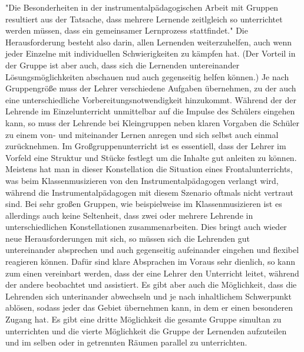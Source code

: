 "Die Besonderheiten in der instrumentalpädagogischen Arbeit mit Gruppen
resultiert aus der Tatsache, dass mehrere Lernende zeitlgleich so unterrichtet
werden müssen, dass ein gemeinsamer Lernprozess stattfindet."
\autocite[221]{busch:grundwissen_instrumentalpaedagogik} Die Herausforderung
besteht also darin, allen Lernenden weiterzuhelfen, auch wenn jeder Einzelne mit
individuellen Schwierigkeiten zu kämpfen hat. (Der Vorteil in der Gruppe ist aber
auch, dass sich die Lernenden untereinander Lösungsmöglichkeiten abschauen nud
auch gegenseitig helfen können.) 
Je nach Gruppengröße muss der Lehrer verschiedene Aufgaben übernehmen,
zu der
auch eine unterschiedliche Vorbereitungsnotwendigkeit hinzukommt. Während der
der Lehrende im Einzelunterricht unmittelbar auf die Impulse des Schülers
eingehen kann, so muss der Lehrende bei Kleingruppen neben klaren Vorgaben die
Schüler zu einem von- und miteinander Lernen anregen und sich selbst auch einmal
zurücknehmen. Im Großgruppenunterricht ist es essentiell, dass der Lehrer im
Vorfeld eine Struktur und Stücke festlegt um die Inhalte gut anleiten zu können.\autocite[220]{busch:grundwissen_instrumentalpaedagogik}
Meistens hat man in dieser Konstellation die Situation eines Frontalunterrichts,
was beim Klassenmusizieren von den Instrumentalpädagogen verlangt wird, während die
Instrumentalpädagogen mit diesem Szenario oftmals nicht vertraut sind. Bei sehr
großen Gruppen, wie beispielweise im
Klassenmusizieren ist es allerdings auch keine Seltenheit, dass zwei oder
mehrere Lehrende in unterschiedlichen Konstellationen zusammenarbeiten. Dies
bringt auch wieder neue Herausforderungen mit sich, so müssen sich die Lehrenden
gut untereinander absprechen und auch gegenseitig aufeinander eingehen und
flexibel reagieren können. Dafür sind klare Absprachen im Voraus sehr dienlich,
so kann zum einen vereinbart werden, dass der eine Lehrer den Unterricht leitet,
während der andere beobachtet und assistiert. Es gibt aber auch die Möglichkeit,
dass die Lehrenden sich unterinander abwechseln und je nach inhaltlichem
Schwerpunkt ablösen, sodass jeder das Gebiet übernehmen kann, in dem er einen
besonderen Zugang hat. Es gibt eine dritte Möglichkeit die gesamte Gruppe
simultan zu unterrichten und die vierte Möglichkeit die Gruppe der Lernenden
aufzuteilen und im selben oder in getrennten Räumen parallel zu unterrichten.
\autocite{cook s. 461} 

